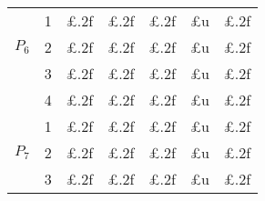 \documentclass[11pt]{article}
\begin{document}
\begin{table}
\begin{tabular}{cc|c|c|c||c|c|}
\multicolumn{1}{|c|}{\multirow{3}{*}{$P_6$}} & 1 
 & \multicolumn{1}{||c|}{£.2f} & £.2f & £.2f & £u & £.2f \\ \cline{2-7} 
\multicolumn{1}{|c|}{} & 2
 & \multicolumn{1}{||c|}{£.2f} & £.2f & £.2f & £u & £.2f \\ \cline{2-7} 
\multicolumn{1}{|c|}{} & 3
 & \multicolumn{1}{||c|}{£.2f} & £.2f & £.2f & £u & £.2f \\ \cline{2-7} 
\multicolumn{1}{|c|}{} & 4
 & \multicolumn{1}{||c|}{£.2f} & £.2f & £.2f & £u & £.2f \\ \hline \hline

\multicolumn{1}{|c|}{\multirow{3}{*}{$P_7$}} & 1 
 & \multicolumn{1}{||c|}{£.2f} & £.2f & £.2f & £u & £.2f \\ \cline{2-7} 
\multicolumn{1}{|c|}{} & 2
 & \multicolumn{1}{||c|}{£.2f} & £.2f & £.2f & £u & £.2f \\ \cline{2-7} 
\multicolumn{1}{|c|}{} & 3
 & \multicolumn{1}{||c|}{£.2f} & £.2f & £.2f & £u & £.2f \\ \hline

\end{tabular}
\end{table}
\end{document}
